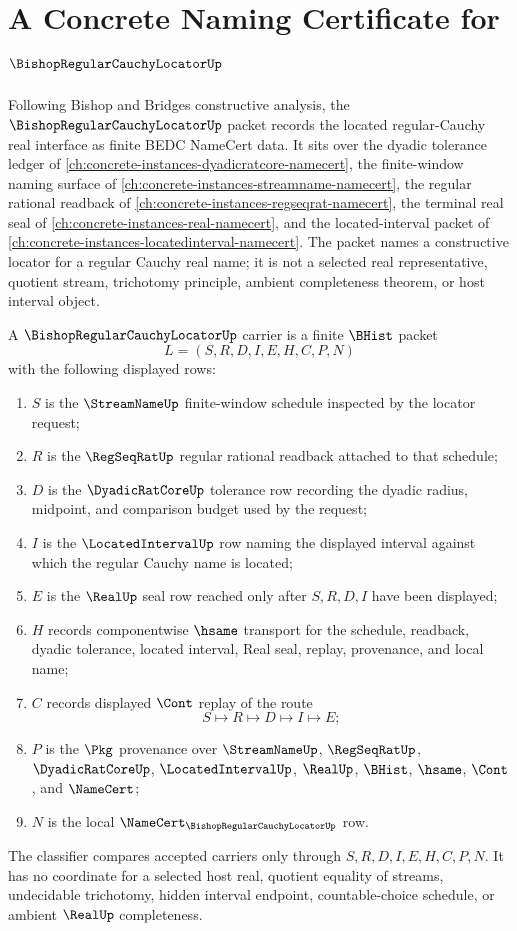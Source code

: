 \chapter{A Concrete Naming Certificate for $\BishopRegularCauchyLocatorUp$}
\label{ch:concrete-instances-bishop-regular-cauchy-locator-namecert}

Following Bishop and Bridges constructive analysis, the $\BishopRegularCauchyLocatorUp$ packet records the located regular-Cauchy real interface as finite BEDC NameCert data. It sits over the dyadic tolerance ledger of \autoref{ch:concrete-instances-dyadicratcore-namecert}, the finite-window naming surface of \autoref{ch:concrete-instances-streamname-namecert}, the regular rational readback of \autoref{ch:concrete-instances-regseqrat-namecert}, the terminal real seal of \autoref{ch:concrete-instances-real-namecert}, and the located-interval packet of \autoref{ch:concrete-instances-locatedinterval-namecert}. The packet names a constructive locator for a regular Cauchy real name; it is not a selected real representative, quotient stream, trichotomy principle, ambient completeness theorem, or host interval object.

\begin{definition}
\label{def:bishop-regular-cauchy-locator-carrier}
A $\BishopRegularCauchyLocatorUp$ carrier is a finite $\BHist$ packet
$$
L=(S,R,D,I,E,H,C,P,N)
$$
with the following displayed rows:
\begin{enumerate}
\item $S$ is the $\StreamNameUp$ finite-window schedule inspected by the locator request;
\item $R$ is the $\RegSeqRatUp$ regular rational readback attached to that schedule;
\item $D$ is the $\DyadicRatCoreUp$ tolerance row recording the dyadic radius, midpoint, and comparison budget used by the request;
\item $I$ is the $\LocatedIntervalUp$ row naming the displayed interval against which the regular Cauchy name is located;
\item $E$ is the $\RealUp$ seal row reached only after $S,R,D,I$ have been displayed;
\item $H$ records componentwise $\hsame$ transport for the schedule, readback, dyadic tolerance, located interval, Real seal, replay, provenance, and local name;
\item $C$ records displayed $\Cont$ replay of the route
$$
S \longmapsto R \longmapsto D \longmapsto I \longmapsto E ;
$$
\item $P$ is the $\Pkg$ provenance over $\StreamNameUp$, $\RegSeqRatUp$, $\DyadicRatCoreUp$, $\LocatedIntervalUp$, $\RealUp$, $\BHist$, $\hsame$, $\Cont$, and $\NameCert$;
\item $N$ is the local $\NameCert_{\BishopRegularCauchyLocatorUp}$ row.
\end{enumerate}
The classifier compares accepted carriers only through $S,R,D,I,E,H,C,P,N$. It has no coordinate for a selected host real, quotient equality of streams, undecidable trichotomy, hidden interval endpoint, countable-choice schedule, or ambient $\RealUp$ completeness.
\end{definition}

